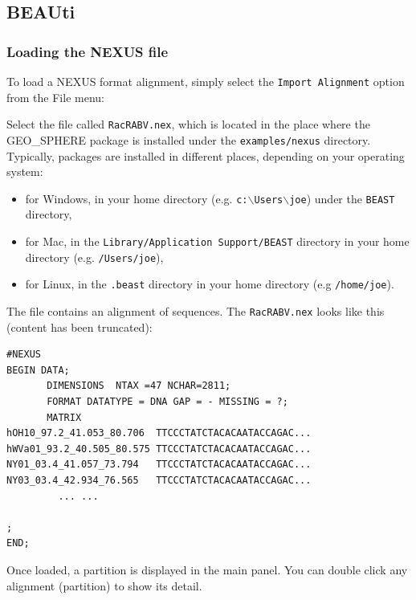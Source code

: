 \documentclass{article}
\def\beast-geo{GEO_SPHERE}
\begin{document}
\subsection*{BEAUti}


\subsubsection*{Loading the NEXUS file }

To load a NEXUS format alignment, simply select the \texttt{Import
Alignment} option from the File menu: 

Select the file called \texttt{RacRABV.nex}, which is located in the place where the \beast-geo{} package is installed 
under the {\tt examples/nexus} directory. Typically, packages are installed in different places, depending on your operating system:
\begin{itemize}
\item for Windows, in your home directory (e.g. {\tt c:$\backslash$Users$\backslash$joe}) under the {\tt BEAST} directory,
\item for Mac, in the {\tt Library/Application Support/BEAST} directory in your home directory (e.g. {\tt /Users/joe}),
\item for Linux, in the {\tt .beast} directory in your home directory (e.g {\tt /home/joe}).
\end{itemize}
The file contains an alignment of sequences. The \texttt{RacRABV.nex} looks like this (content has been truncated):

\begin{verbatim}
#NEXUS
BEGIN DATA;
       DIMENSIONS  NTAX =47 NCHAR=2811;
       FORMAT DATATYPE = DNA GAP = - MISSING = ?;
       MATRIX   
hOH10_97.2_41.053_80.706  TTCCCTATCTACACAATACCAGAC...
hWVa01_93.2_40.505_80.575 TTCCCTATCTACACAATACCAGAC...
NY01_03.4_41.057_73.794   TTCCCTATCTACACAATACCAGAC...
NY03_03.4_42.934_76.565   TTCCCTATCTACACAATACCAGAC...
         ... ...

;
END;
\end{verbatim}

\medskip{}

Once loaded, a partition is displayed in the main panel.
You can double click any alignment (partition) to show its detail.
\end{document}
